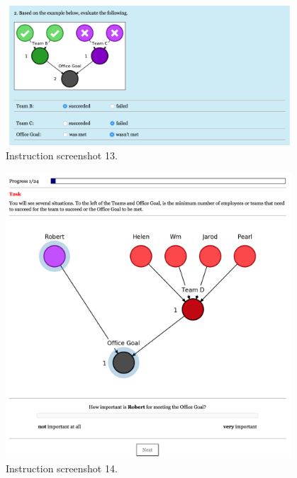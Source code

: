 \documentclass[11pt]{article}
\begin{document}
\begin{figure}[H]
	\centering
	\includegraphics[width=0.95\textwidth]{screenshot_13}
	\caption{Instruction screenshot 13.}
	\label{fig:screenshot_13}
\end{figure}
\begin{figure}[H]
	\centering
	\includegraphics[width=0.95\textwidth]{screenshot_14}
	\caption{Instruction screenshot 14.}
	\label{fig:screenshot_14}
\end{figure}
\end{document}
